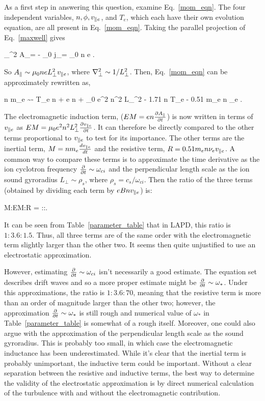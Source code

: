 As a first step in answering this question, examine Eq.~\ref{mom_eqn}. The four independent variables, $n, \phi, v_{\parallel e}$, and $T_e$, which each have their own evolution equation, are all
present in Eq.~\ref{mom_eqn}. Taking the parallel projection of Eq.~\ref{maxwell} gives

\beq
\label{Apar_eqn}
\grad_\perp^2 A_\para = - \mu_0 j_\para = \mu_0 n e \vpe.
\eeq

So $A_\parallel \sim \mu_0 n e L_\perp^2 v_{\parallel e}$, where $\nabla_\perp^2 \sim 1/L_\perp^2$. Then, Eq.~\ref{mom_eqn} can be approximately rewritten as,

\beq
\label{mom_eqn_Apar}
n m_e  \sim - T_e \gradpar n + e n \gradpar \phi + \mu_0 e^2 n^2 L_\perp^2  - 1.71 n \gradpar T_e - 0.51 m_e n \nu_e \vpe.
\eeq

The electromagnetic induction term, ($EM = e n \frac{\partial A_\parallel}{\partial t}$) is now written in terms of $v_{\parallel e}$ as $EM = \mu_0 e^2 n^2 L_\perp^2 \frac{\partial v_{\parallel e}}{\partial t}$. 
It can therefore be directly compared to the other terms proportional to $v_{\parallel e}$ to test for its importance. 
The other terms are the inertial term, $M = n m_e \frac{dv_{\parallel e}}{dt}$ and the resistive term, $R = 0.51 m_e n \nu_e v_{\parallel e}$. A common way to compare these terms is to approximate the time
derivative as the ion cyclotron frequency $\frac{\partial}{\partial t} \sim \omega_{ci}$ and the perpendicular length scale as the ion sound gyroradius $L_\perp \sim \rho_s$, where $\rho_s = c_s/\omega_{ci}$.
Then the ratio of the three terms (obtained by dividing each term by $e B n v_{\parallel e}$) is: 

\beq
\label{adiabatic_ratio}
M:EM:R = \fmei:\beta:. 
\eeq

It can be seen from Table~\ref{parameter_table} that in LAPD, this ratio is 
$1:3.6:1.5$. Thus, all three terms are of the same order with the electromagnetic term slightly larger than the other two. It seems then quite unjustified to use an electrostatic
approximation. 

However, estimating $\frac{\partial}{\partial t} \sim \omega_{ci}$ isn't necessarily a good estimate. The equation set describes drift waves and so a more proper estimate might be
$\frac{\partial}{\partial t} \sim \omega_{*}$. Under this approximations, the ratio is $1:3.6:70$, meaning that the resistive term is more than an order of magnitude larger than the other two; however, the 
approximation $\frac{\partial}{\partial t} \sim \omega_{*}$ is still rough and numerical value of $\omega_{*}$ in Table~\ref{parameter_table} is somewhat of a rough itself. 
Moreover, one could also argue with the approximation of the perpendicular length scale as the sound gyroradius. 
This is probably too small, in which case the electromagnetic inductance has been underestimated. While it's clear that
the inertial term is probably unimportant, the inductive term could be important. Without a clear separation between the resistive and inductive terms, the best way to determine the validity of
the electrostatic approximation is by direct numerical calculation of the turbulence with and without the electromagnetic contribution. 

